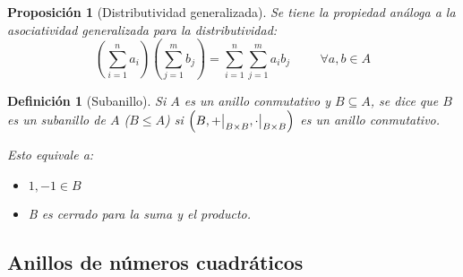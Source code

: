 \documentclass[11pt, a4paper, titlepage]{article}
\newcommand\restr[2]{{%
  \left.\kern-\nulldelimiterspace %
  #1 %
  \vphantom{\big|} %
  \right|_{#2} %
  }}
\theoremstyle{theorem-style}
\newtheorem*{nprop}{Proposición}
\theoremstyle{definition-style}
\newtheorem*{ndef}{Definición}
\theoremstyle{remark-style}
\theoremstyle{example-style}
\begin{document}
\begin{nprop}[Distributividad generalizada]
Se tiene la propiedad análoga a la asociatividad generalizada para la distributividad:
	\[\left(\sum_{i=1}^{n} a_i\right)\left(\sum_{j=1}^{m}b_j\right) = \sum_{i=1}^{n}\sum_{j=1}^{m}a_i b_j \hspace{1cm} \forall a,b\in A\]
\end{nprop}

\begin{ndef}[Subanillo]

Si $A$ es un anillo conmutativo y $B \subseteq A$, se dice que $B$ es un subanillo de $A$ ($B \leq A$) si $\left(B, \restr{+}{B\times B}, \restr{\cdot}{B\times B}\right)$ es un anillo conmutativo.

Esto equivale a:
\begin{itemize}
\item $1,-1 \in B$
\item B es cerrado para la suma y el producto.
\end{itemize}
	
\end{ndef}

\newpage

\subsection*{Anillos de números cuadráticos}
\end{document}
